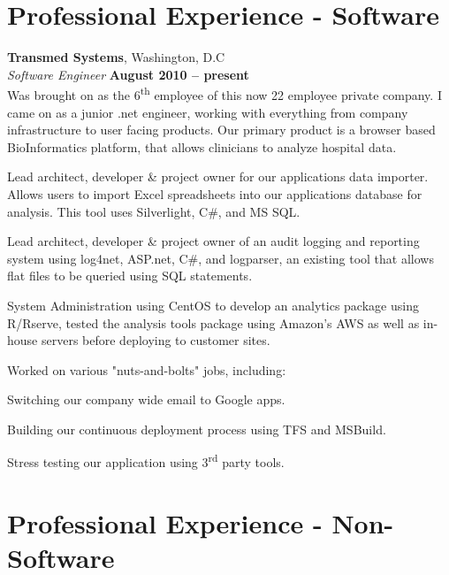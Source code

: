 \documentclass[margin,line]{resume}
\begin{document}
\begin{resume}
\section{\mysidestyle Professional Experience - Software}

    \textbf{Transmed Systems}, Washington, D.C \vspace{1mm}\\\vspace{1mm}%
    \textsl{Software Engineer} \hfill \textbf{August 2010 -- present}\vspace{1mm}\\\vspace{0mm}%
	Was brought on as the 6\textsuperscript{th} employee of this now 22 employee private company. I came on as a junior .net engineer, working with everything from company infrastructure to user facing products. Our primary product is a browser based BioInformatics platform, that allows clinicians to analyze hospital data.
\vspace{-3mm}\\\vspace{1mm}
    \begin{list2}
    \item Lead architect, developer \& project owner for our applications data importer. Allows users to import Excel spreadsheets into our applications database for analysis. This tool uses Silverlight, C\#, and MS SQL.
    \item Lead architect, developer \& project owner of an audit logging and reporting system using log4net, ASP.net, C\#, and logparser, an existing tool that allows flat files to be queried using SQL statements.
    \item System Administration using CentOS to develop an analytics package using R/Rserve, tested the analysis tools package using Amazon's AWS as well as in-house servers before deploying to customer sites.
  \end{list2}
Worked on various "nuts-and-bolts" jobs, including:
\begin{list2}
    \item Switching our company wide email to Google apps.
    \item Building our continuous deployment process using TFS and MSBuild.
    \item Stress testing our application using 3\textsuperscript{rd} party tools.
  \end{list2}
	
 \section{\mysidestyle Professional Experience - Non-Software}
   

\end{resume}
\end{document}
